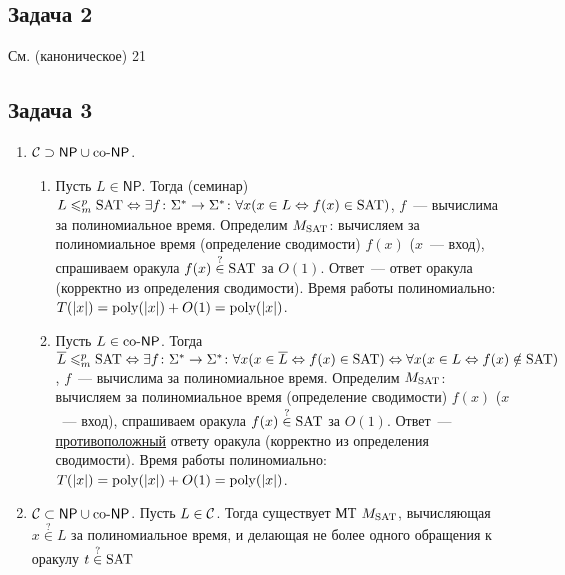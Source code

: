 \documentclass[a4paper]{article}
\def\C{{\cal C}}
\def\NP{{\mathsf{NP}}}
\def\coNP{{\rm co}\text{-}{\mathsf{NP}}}
\def\SAT{{\rm{SAT}}}
\def\poly{{\rm{poly}}}
\begin{document}
\subsection*{Задача 2}
См. (каноническое) 21
\subsection*{Задача 3}
\begin{enumerate}
\item $\C\supset \NP\cup\coNP$.\begin{enumerate}
\item Пусть $L\in\NP$. Тогда (семинар) $L\leqslant_m^p\SAT\Leftrightarrow \exists f\colon\Sigma^*\to\Sigma^*\colon\forall x(x\in L\Leftrightarrow f(x)\in\SAT)$, $f$~--- вычислима за полиномиальное время. Определим $M_{\SAT}$: вычисляем за полиномиальное время (определение сводимости) $f(x)$ ($x$~--- вход), спрашиваем оракула $f(x)\overset{?}{\in}\SAT$ за $O(1)$. Ответ~--- ответ оракула (корректно из определения сводимости).  Время работы полиномиально: $T(|x|)=\poly(|x|)+O(1)=\poly(|x|)$.
\item Пусть $L\in\coNP$. Тогда $\overline{L}\leqslant_m^p\SAT\Leftrightarrow \exists f\colon\Sigma^*\to\Sigma^*\colon\forall x(x\in \overline{L}\Leftrightarrow f(x)\in\SAT)\Leftrightarrow\forall x(x\in L\Leftrightarrow f(x)\notin\SAT)$, $f$~--- вычислима за полиномиальное время. Определим $M_{\SAT}$: вычисляем за полиномиальное время (определение сводимости) $f(x)$ ($x$~--- вход), спрашиваем оракула $f(x)\overset{?}{\in}\SAT$ за $O(1)$. Ответ~--- \underline{противоположный} ответу оракула (корректно из определения сводимости). Время работы полиномиально: $T(|x|)=\poly(|x|)+O(1)=\poly(|x|)$.
\end{enumerate}
\item $\C\subset\NP\cup\coNP$. Пусть $L\in \C$. Тогда существует МТ $M_\SAT$, вычисляющая $x\overset{?}{\in}L$ за полиномиальное время, и делающая не более одного обращения к оракулу $t\overset{?}{\in}\SAT$
\end{enumerate}
\end{document}
